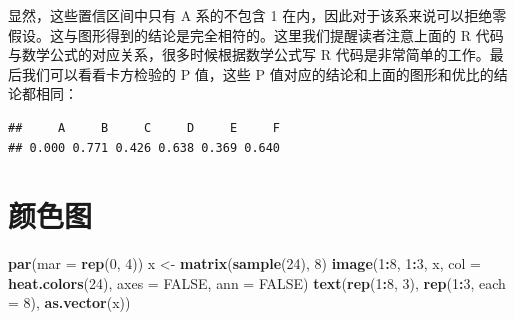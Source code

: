 \documentclass[
  b5paper,
  UTF8,twoside]{book}
\newenvironment{Shaded}{\begin{snugshade}}{\end{snugshade}}
\newcommand{\AttributeTok}[1]{\textcolor[rgb]{0.13,0.29,0.53}{#1}}
\newcommand{\CommentTok}[1]{\textcolor[rgb]{0.56,0.35,0.01}{\textit{#1}}}
\newcommand{\ConstantTok}[1]{\textcolor[rgb]{0.56,0.35,0.01}{#1}}
\newcommand{\ControlFlowTok}[1]{\textcolor[rgb]{0.13,0.29,0.53}{\textbf{#1}}}
\newcommand{\DecValTok}[1]{\textcolor[rgb]{0.00,0.00,0.81}{#1}}
\newcommand{\FunctionTok}[1]{\textcolor[rgb]{0.13,0.29,0.53}{\textbf{#1}}}
\newcommand{\NormalTok}[1]{#1}
\newcommand{\OtherTok}[1]{\textcolor[rgb]{0.56,0.35,0.01}{#1}}
\newcommand{\SpecialCharTok}[1]{\textcolor[rgb]{0.81,0.36,0.00}{\textbf{#1}}}
\begin{document}
显然，这些置信区间中只有 A 系的不包含 1 在内，因此对于该系来说可以拒绝零假设。这与图形得到的结论是完全相符的。这里我们提醒读者注意上面的 R 代码与数学公式的对应关系，很多时候根据数学公式写 R 代码是非常简单的工作。最后我们可以看看卡方检验的 P 值，这些 P 值对应的结论和上面的图形和优比的结论都相同：

\begin{Shaded}
\end{Shaded}

\begin{verbatim}
##     A     B     C     D     E     F 
## 0.000 0.771 0.426 0.638 0.369 0.640
\end{verbatim}

\section{颜色图}\label{sec:image}





\begin{Shaded}
\begin{Highlighting}[]
\FunctionTok{par}\NormalTok{(}\AttributeTok{mar =} \FunctionTok{rep}\NormalTok{(}\DecValTok{0}\NormalTok{, }\DecValTok{4}\NormalTok{))}
\NormalTok{x }\OtherTok{\textless{}{-}} \FunctionTok{matrix}\NormalTok{(}\FunctionTok{sample}\NormalTok{(}\DecValTok{24}\NormalTok{), }\DecValTok{8}\NormalTok{)}
\FunctionTok{image}\NormalTok{(}\DecValTok{1}\SpecialCharTok{:}\DecValTok{8}\NormalTok{, }\DecValTok{1}\SpecialCharTok{:}\DecValTok{3}\NormalTok{, x, }\AttributeTok{col =} \FunctionTok{heat.colors}\NormalTok{(}\DecValTok{24}\NormalTok{), }\AttributeTok{axes =} \ConstantTok{FALSE}\NormalTok{, }\AttributeTok{ann =} \ConstantTok{FALSE}\NormalTok{)}
\FunctionTok{text}\NormalTok{(}\FunctionTok{rep}\NormalTok{(}\DecValTok{1}\SpecialCharTok{:}\DecValTok{8}\NormalTok{, }\DecValTok{3}\NormalTok{), }\FunctionTok{rep}\NormalTok{(}\DecValTok{1}\SpecialCharTok{:}\DecValTok{3}\NormalTok{, }\AttributeTok{each =} \DecValTok{8}\NormalTok{), }\FunctionTok{as.vector}\NormalTok{(x))}
\end{Highlighting}
\end{Shaded}
\end{document}
